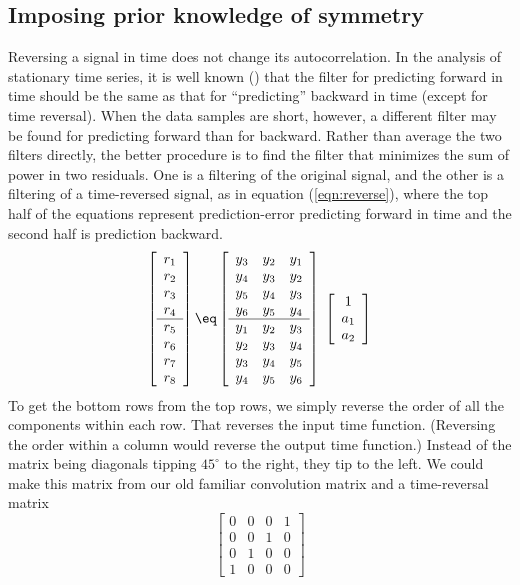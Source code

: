 \subsection{Imposing prior knowledge of symmetry}
\label{prior knowledge of symmetry}
Reversing a signal in time
does not change its autocorrelation.
In the analysis of stationary time series,
it is well known () that the filter
for predicting forward in time
should be the same as that for ``predicting'' backward in time
(except for time reversal).
When the data samples are short, however,
a different filter may be found for predicting forward than for backward.
Rather than average the two filters directly,
the better procedure
is to find the filter that minimizes the sum of power in two residuals.
One is a filtering of the original signal,
and the other is a filtering of a time-reversed signal,
as in equation (\ref{eqn:reverse}),
where the top half of the equations represent prediction-error
predicting forward in time and the second half is prediction backward.
\begin{equation}
\left[
\begin{array}{c}
  r_1 \\
  r_2 \\
  r_3 \\
  r_4 \\   \hline
  r_5 \\
  r_6 \\
  r_7 \\
  r_8
  \end{array} \right]
\eq
\left[
\begin{array}{ccc}
  y_3 & y_2 & y_1  \\
  y_4 & y_3 & y_2  \\
  y_5 & y_4 & y_3  \\
  y_6 & y_5 & y_4  \\   \hline
  y_1 & y_2 & y_3  \\
  y_2 & y_3 & y_4  \\
  y_3 & y_4 & y_5  \\
  y_4 & y_5 & y_6 
  \end{array} \right]
\; \left[
\begin{array}{c}
  1   \\
  a_1 \\
  a_2 \end{array} \right]
\label{eqn:reverse}
\end{equation}
To get the bottom rows from the top rows,
we simply reverse the order of all the components within each row.
That reverses the input time function.
(Reversing the order within a column would reverse the output time function.)
Instead of the matrix being diagonals tipping $45^\circ$ to the right,
they tip to the left.
We could make this matrix from our old
familiar convolution matrix
and a time-reversal matrix
$$
\left[
\begin{array}{cccc}
 0 & 0 & 0 & 1  \\
 0 & 0 & 1 & 0  \\
 0 & 1 & 0 & 0  \\
 1 & 0 & 0 & 0 
\end{array}
\right]
$$

